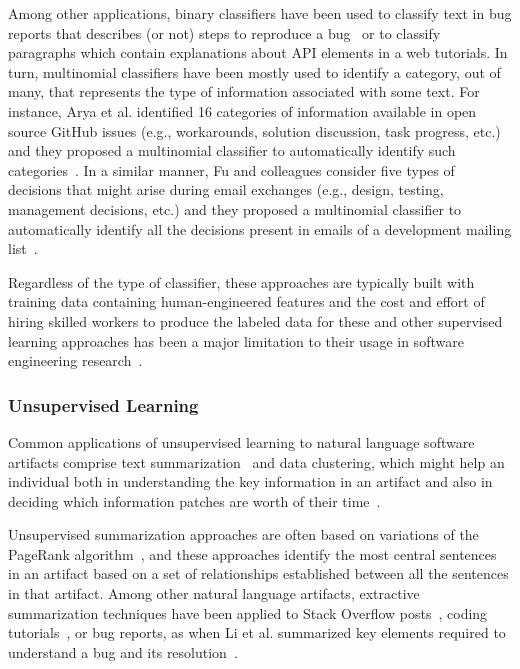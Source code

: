 Among other applications, binary classifiers have been used 
to classify text in bug reports that describes (or not) steps to reproduce a bug~\cite{Chaparro2016}
or  to classify paragraphs which contain explanations 
about API elements in a web tutorials\cite{Petrosyan2015}.
In turn, multinomial classifiers have been mostly used 
to identify a category, out of many, that represents the type of information 
associated with some text. For instance, Arya et al. identified 16 categories of  information available
in open source GitHub issues (e.g., workarounds, solution discussion, task progress, etc.)
and they proposed a multinomial classifier 
to automatically identify such categories~\cite{Arya2019}.
In a similar manner, Fu and colleagues consider 
five types of decisions that might arise during 
email exchanges (e.g., design, testing, management decisions, etc.)
and they proposed a multinomial classifier 
to automatically identify all the decisions present in emails of
a development mailing list~\cite{fu2021}.





Regardless of the type of classifier, these approaches are typically built 
with training data containing human-engineered features and the cost and effort of hiring skilled workers to produce 
the labeled data for these and other supervised learning approaches
has been a major limitation to their usage in software engineering research~\cite{Arpteg2018, ferreira2021}.




\subsubsection{Unsupervised Learning}
\label{cp2:unsupervised}



Common applications of unsupervised learning 
to natural language software artifacts 
comprise text summarization~\cite{Goldsteinet1999} and data clustering, which might help an individual both in understanding the key information in an 
artifact and also in deciding which information patches are 
 worth of their time~\cite{Lotufo2012}.


Unsupervised summarization approaches are often based on 
variations of the PageRank algorithm~\cite{Page1999}, and these approaches identify
the most central sentences in an artifact based on a set of relationships
established between all the sentences in that artifact.
Among other natural language artifacts,
extractive summarization techniques
have been applied to Stack Overflow posts~\cite{Ponzanelli2015},
coding tutorials~\cite{Li2018},
or bug reports, as
when Li et al. summarized 
key elements required to understand a bug and its resolution~\cite{li2018deep}.




